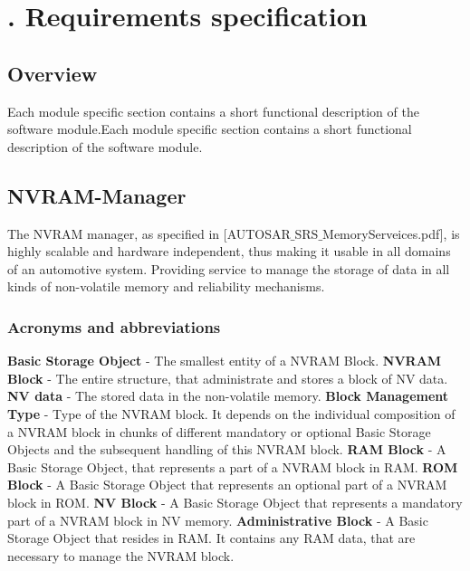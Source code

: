 \newcommand{\FR}{BSW}

\chapter[Requirements]{\thechapter. Requirements specification}

\section{Overview}Each module specific section contains a short functional description of the software module.Each module specific section contains a short functional description of the software module.

\section{NVRAM-Manager}
The \mbox{NVRAM} manager, as specified in [AUTOSAR$\_$SRS$\_$MemoryServeices.pdf], is highly scalable and hardware independent, thus making it usable in all domains of an automotive system. Providing service to manage the storage of data in all kinds of non-volatile memory and reliability mechanisms.

\subsection{Acronyms and abbreviations}
{\bf Basic Storage Object} - The smallest entity of a NVRAM Block.\newline
\newline 
{\bf NVRAM Block} - The entire structure, that administrate and stores a block of NV data.\newline
\newline
{\bf NV data} -  The stored data in the non-volatile memory.\newline
\newline
{\bf Block Management Type} - Type of the NVRAM block. It depends on the individual composition of a NVRAM block in chunks of different mandatory or optional Basic Storage Objects and the subsequent handling of this NVRAM block.\newline
\newline
{\bf RAM Block} - A Basic Storage Object, that represents a part of a NVRAM block in RAM.\newline
\newline
{\bf ROM Block} - A Basic Storage Object that represents an optional part of a NVRAM block in ROM.\newline
\newline
{\bf NV Block} -  A Basic Storage Object that represents a mandatory part of a NVRAM block in NV memory.\newline
\newline
{\bf Administrative Block} - A Basic Storage Object that resides in RAM. It contains any RAM data, that are necessary to manage the NVRAM block.

